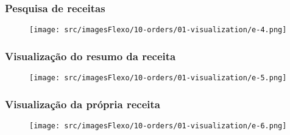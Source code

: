 \newpage
\thispagestyle{fancy}
\vspace*{\fill}
\subsubsection{\small{Pesquisa de receitas}}
\begin{figure}[h]
  \centering
  \texttt{[image: src/imagesFlexo/10-orders/01-visualization/e-4.png]}
\end{figure}
\vspace*{\fill}

\newpage
\thispagestyle{fancy}
\vspace*{\fill}
\subsubsection{\small{Visualização do resumo da receita}}
\begin{figure}[h]
  \centering
  \texttt{[image: src/imagesFlexo/10-orders/01-visualization/e-5.png]}
\end{figure}
\vspace*{\fill}

\newpage
\thispagestyle{fancy}
\vspace*{\fill}
\subsubsection{\small{Visualização da própria receita}}
\begin{figure}[h]
  \centering
  \texttt{[image: src/imagesFlexo/10-orders/01-visualization/e-6.png]}
\end{figure}
\vspace*{\fill}